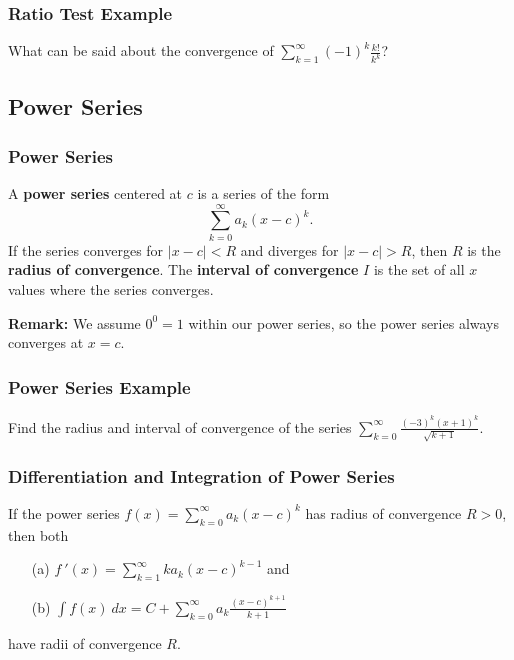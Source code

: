 \documentclass{beamer}
\begin{document}
 \begin{frame}[t]
  \frametitle{Ratio Test Example} 
  \begin{Example}
What can be said about the convergence of $\displaystyle\sum_{k = 1}^\infty (-1)^k\frac{k!}{k^k}$?
\end{Example}
\end{frame}

\subsection{Power Series}

\begin{frame}
\frametitle{Power Series}
\begin{Definition}
A {\bf power series} centered at $c$ is a series of the form
$$
\sum_{k = 0}^\infty a_k (x - c)^k.
$$
If the series converges for $|x - c| < R$ and diverges for $|x - c| > R$, then $R$ is the {\bf radius of convergence}. The {\bf interval of convergence} $I$ is the set of all $x$ values where the series converges. 
\end{Definition}
{\bf Remark:} We assume $0^0 = 1$ within our power series, so the power series always converges at $x = c$.
\end{frame}

\begin{frame}[t]
\frametitle{Power Series Example}
\begin{Example}
Find the radius and interval of convergence of the series $\displaystyle\sum_{k = 0}^\infty \frac{(-3)^k (x + 1)^k}{\sqrt{k + 1}}$.
\end{Example}

\end{frame}

\begin{frame}
\frametitle{Differentiation and Integration of Power Series}
\begin{Theorem}
If the power series $f(x) = \displaystyle\sum_{k = 0}^\infty a_k (x - c)^k$ has radius of convergence $R > 0$, then both
\begin{enumerate}
\item[(a)] $\displaystyle f\ ' (x) = \sum_{k = 1}^\infty k a_k (x - c)^{k - 1}$ and
\item[(b)] $\displaystyle\int f(x)\ dx = C + \sum_{k = 0}^\infty a_k \frac{(x - c)^{k + 1}}{k + 1}$
\end{enumerate}
have radii of convergence $R$.
\end{Theorem}
\end{frame}
\end{document}
